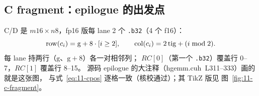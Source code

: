 \subsection{C fragment：epilogue 的出发点}

C/D 是 $m16 \times n8$，fp16 版每 lane 2 个 \texttt{.b32}（4 个 f16）：
\begin{equation}
  \mathrm{row}(c\sb i) = \mathrm{g} + 8\cdot[i \ge 2],
  \qquad \mathrm{col}(c\sb i) = 2\,\mathrm{tig} + (i \bmod 2).
  \label{eq:11-cpos}
\end{equation}
每 lane 持两行（$\mathrm{g}$、$\mathrm{g}{+}8$）各一对相邻列；
$RC[0]$（第一个 \texttt{.b32}）覆盖行 0--7，$RC[1]$ 覆盖行 8--15。
源码 epilogue 的大注释（hgemm.cuh~L311--333）画的就是这张图，
与式~\ref{eq:11-cpos} 逐格一致（核校通过）；其 TikZ 版见
图~\ref{fig:11-c-fragment}。

